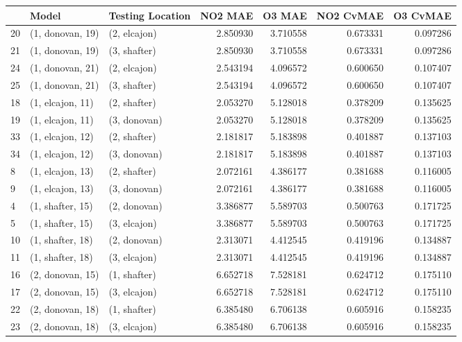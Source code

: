 \begin{tabular}{lllrrrr}
\toprule
{} &             Model & Testing Location &   NO2 MAE &    O3 MAE &  NO2 CvMAE &  O3 CvMAE \\
\midrule
20 &  (1, donovan, 19) &     (2, elcajon) &  2.850930 &  3.710558 &   0.673331 &  0.097286 \\
21 &  (1, donovan, 19) &     (3, shafter) &  2.850930 &  3.710558 &   0.673331 &  0.097286 \\
24 &  (1, donovan, 21) &     (2, elcajon) &  2.543194 &  4.096572 &   0.600650 &  0.107407 \\
25 &  (1, donovan, 21) &     (3, shafter) &  2.543194 &  4.096572 &   0.600650 &  0.107407 \\
18 &  (1, elcajon, 11) &     (2, shafter) &  2.053270 &  5.128018 &   0.378209 &  0.135625 \\
19 &  (1, elcajon, 11) &     (3, donovan) &  2.053270 &  5.128018 &   0.378209 &  0.135625 \\
33 &  (1, elcajon, 12) &     (2, shafter) &  2.181817 &  5.183898 &   0.401887 &  0.137103 \\
34 &  (1, elcajon, 12) &     (3, donovan) &  2.181817 &  5.183898 &   0.401887 &  0.137103 \\
8  &  (1, elcajon, 13) &     (2, shafter) &  2.072161 &  4.386177 &   0.381688 &  0.116005 \\
9  &  (1, elcajon, 13) &     (3, donovan) &  2.072161 &  4.386177 &   0.381688 &  0.116005 \\
4  &  (1, shafter, 15) &     (2, donovan) &  3.386877 &  5.589703 &   0.500763 &  0.171725 \\
5  &  (1, shafter, 15) &     (3, elcajon) &  3.386877 &  5.589703 &   0.500763 &  0.171725 \\
10 &  (1, shafter, 18) &     (2, donovan) &  2.313071 &  4.412545 &   0.419196 &  0.134887 \\
11 &  (1, shafter, 18) &     (3, elcajon) &  2.313071 &  4.412545 &   0.419196 &  0.134887 \\
16 &  (2, donovan, 15) &     (1, shafter) &  6.652718 &  7.528181 &   0.624712 &  0.175110 \\
17 &  (2, donovan, 15) &     (3, elcajon) &  6.652718 &  7.528181 &   0.624712 &  0.175110 \\
22 &  (2, donovan, 18) &     (1, shafter) &  6.385480 &  6.706138 &   0.605916 &  0.158235 \\
23 &  (2, donovan, 18) &     (3, elcajon) &  6.385480 &  6.706138 &   0.605916 &  0.158235 \\

\end{tabular}
